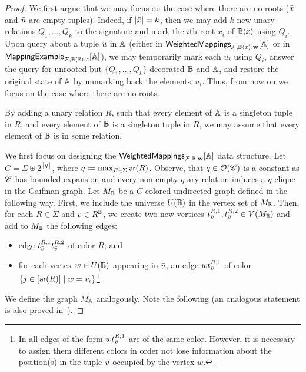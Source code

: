 \begin{proof}
	We first argue that we may focus on the case where there are no roots (${\bar{x}}$ and ${\bar{u}}$ are empty tuples). Indeed, if $|{\bar{x}}|=k$, then we may add $k$ new unary relations $Q_1,\ldots,Q_k$ to the signature and mark the $i$th root $x_i$ of $\mathbb{B}\langle {\bar{x}}\rangle$ using $Q_i$. Upon query about a tuple ${\bar{u}}$ in $\mathbb{A}$ (either in $\mathsf{WeightedMappings}_{\mathcal{F}, \mathbb{B}\langle {\bar{x}}\rangle,\mathbf{w}}[\mathbb{A}]$ or in $\mathsf{MappingExample}_{\mathcal{F}, \mathbb{B}\langle {\bar{x}}\rangle,\varepsilon}[\mathbb{A}]$), we may temporarily mark each $u_i$ using $Q_i$, answer the query for unrooted but $\{Q_1,\ldots,Q_k\}$-decorated $\mathbb{B}$ and $\mathbb{A}$, and restore the original state of $\mathbb{A}$ by unmarking back the elements~$u_i$. Thus, from now on we focus on the case where there are no roots.
	
	By adding a unary relation $R$, such that every element of $\mathbb{A}$ is a singleton tuple
	in $R$, and every element of $\mathbb{B}$ is a singleton tuple in $R$, we may assume that every element of $\mathbb{B}$ is in some relation.
	
	We first focus on designing the $\mathsf{WeightedMappings}_{\mathcal{F},\mathbb{B},\mathbf{w}}[\mathbb{A}]$ data structure.
	Let $C=\Sigma\uplus 2^{[q]}$, where $q\coloneqq \max_{R\in \Sigma} \mathsf{ar}(R)$.
	Observe, that $q \in \mathcal{O}(\mathscr C)$ is a constant as $\mathscr C$ has bounded expansion and
	every non-empty $q$-ary relation induces a $q$-clique in the Gaifman graph.
	Let $M_{\mathbb{B}}$ be a $C$-colored undirected graph defined in the following way. First, we include the universe $U(\mathbb{B})$ in the vertex set of $M_{\mathbb{B}}$. Then, for each $R\in \Sigma$ and ${\bar{v}}\in R^{\mathbb{B}}$, we create two new vertices $t^{R,1}_{{\bar{v}}}, t^{R,2}_{{\bar{v}}} \in V(M_{\mathbb{B}})$ and add to $M_{\mathbb{B}}$ the following edges:
	\begin{itemize}
		\item edge $t^{R,1}_{{\bar{v}}}t^{R,2}_{{\bar{v}}}$ of color $R$; and
		\item for each vertex $w\in U(\mathbb{B})$ appearing in ${\bar{v}}$, an edge $wt^{R,1}_{{\bar{v}}}$ of color $\{j\in [\mathsf{ar}(R)]\mid w=v_i\}$\footnote{In \cite[Section~4]{DvorakTumaArxiv} all edges of the form $wt^{R,1}_{{\bar{v}}}$ are of the same color. However, it is necessary to assign them different colors in order not lose information about the position(s) in the tuple ${\bar{v}}$ occupied by the vertex $w$.}.
	\end{itemize}
	We define the graph $M_{\mathbb{A}}$ analogously. Note the following (an analogous statement is also proved in~\cite{DvorakTumaArxiv}).
	

\end{proof}

